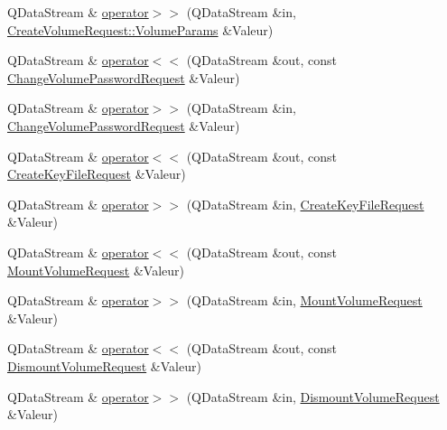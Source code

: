\begin{DoxyCompactItemize}
Q\+Data\+Stream \& \hyperlink{namespace_gost_crypt_1_1_core_a0a56eb72d027d01dc82262b3cc60648e}{operator$>$$>$} (Q\+Data\+Stream \&in, \hyperlink{struct_gost_crypt_1_1_core_1_1_create_volume_request_1_1_volume_params}{Create\+Volume\+Request\+::\+Volume\+Params} \&Valeur)
\item 
Q\+Data\+Stream \& \hyperlink{namespace_gost_crypt_1_1_core_a3344439470718b08bbc49c29da994cb2}{operator$<$$<$} (Q\+Data\+Stream \&out, const \hyperlink{struct_gost_crypt_1_1_core_1_1_change_volume_password_request}{Change\+Volume\+Password\+Request} \&Valeur)
\item 
Q\+Data\+Stream \& \hyperlink{namespace_gost_crypt_1_1_core_ac259fa6bbe047267034e2fba99d2d40c}{operator$>$$>$} (Q\+Data\+Stream \&in, \hyperlink{struct_gost_crypt_1_1_core_1_1_change_volume_password_request}{Change\+Volume\+Password\+Request} \&Valeur)
\item 
Q\+Data\+Stream \& \hyperlink{namespace_gost_crypt_1_1_core_a581eef0582497ef8fa67dc14ad5001c3}{operator$<$$<$} (Q\+Data\+Stream \&out, const \hyperlink{struct_gost_crypt_1_1_core_1_1_create_key_file_request}{Create\+Key\+File\+Request} \&Valeur)
\item 
Q\+Data\+Stream \& \hyperlink{namespace_gost_crypt_1_1_core_afa72d8e7476ba374c78482674682fcf0}{operator$>$$>$} (Q\+Data\+Stream \&in, \hyperlink{struct_gost_crypt_1_1_core_1_1_create_key_file_request}{Create\+Key\+File\+Request} \&Valeur)
\item 
Q\+Data\+Stream \& \hyperlink{namespace_gost_crypt_1_1_core_a8e7f64d391e2b1e639fe7273cc08334c}{operator$<$$<$} (Q\+Data\+Stream \&out, const \hyperlink{struct_gost_crypt_1_1_core_1_1_mount_volume_request}{Mount\+Volume\+Request} \&Valeur)
\item 
Q\+Data\+Stream \& \hyperlink{namespace_gost_crypt_1_1_core_a5209c2348a9e16fc9e9c5177101b07f5}{operator$>$$>$} (Q\+Data\+Stream \&in, \hyperlink{struct_gost_crypt_1_1_core_1_1_mount_volume_request}{Mount\+Volume\+Request} \&Valeur)
\item 
Q\+Data\+Stream \& \hyperlink{namespace_gost_crypt_1_1_core_a853e8e6d522159a7176b1a7066a0fe07}{operator$<$$<$} (Q\+Data\+Stream \&out, const \hyperlink{struct_gost_crypt_1_1_core_1_1_dismount_volume_request}{Dismount\+Volume\+Request} \&Valeur)
\item 
Q\+Data\+Stream \& \hyperlink{namespace_gost_crypt_1_1_core_ae557c3a7cf37642396e71a7e8af96acf}{operator$>$$>$} (Q\+Data\+Stream \&in, \hyperlink{struct_gost_crypt_1_1_core_1_1_dismount_volume_request}{Dismount\+Volume\+Request} \&Valeur)

\end{DoxyCompactItemize}
